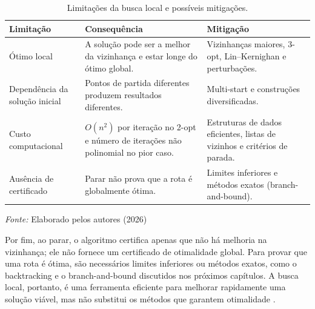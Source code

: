 \begin{table}[htb]
\centering
\caption{Limitações da busca local e possíveis mitigações.}
\label{tab:limitacoes-busca-local}
\small
\renewcommand{\arraystretch}{1.25}
\begin{tabular}{|>{\raggedright\arraybackslash}p{3.8cm}|>{\raggedright\arraybackslash}p{5.2cm}|>{\raggedright\arraybackslash}p{4.2cm}|}
\hline
\rowcolor{gray!20}
\textbf{Limitação} & \textbf{Consequência} & \textbf{Mitigação} \\ \hline
Ótimo local & A solução pode ser a melhor da vizinhança e estar longe do ótimo global. & Vizinhanças maiores, 3-opt, Lin--Kernighan e perturbações. \\ \hline
Dependência da solução inicial & Pontos de partida diferentes produzem resultados diferentes. & Multi-start e construções diversificadas. \\ \hline
Custo computacional & $O(n^2)$ por iteração no 2-opt e número de iterações não polinomial no pior caso. & Estruturas de dados eficientes, listas de vizinhos e critérios de parada. \\ \hline
Ausência de certificado & Parar não prova que a rota é globalmente ótima. & Limites inferiores e métodos exatos (branch-and-bound). \\ \hline
\end{tabular}

\footnotesize{\textit{Fonte:} Elaborado pelos autores (2026)}
\end{table}

Por fim, ao parar, o algoritmo certifica apenas que não há melhoria na vizinhança; ele não fornece um certificado de otimalidade global. Para provar que uma rota é ótima, são necessários limites inferiores ou métodos exatos, como o backtracking e o branch-and-bound discutidos nos próximos capítulos. A busca local, portanto, é uma ferramenta eficiente para melhorar rapidamente uma solução viável, mas não substitui os métodos que garantem otimalidade \cite{cormen2012, miyazawa_intro}.
